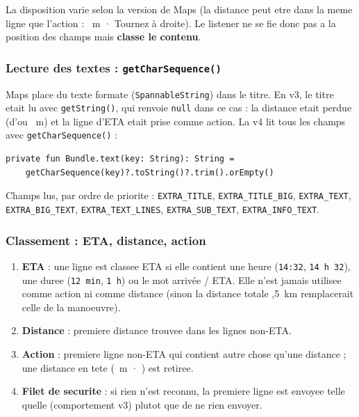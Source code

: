 \documentclass[a4paper,11pt]{article}
\begin{document}
La disposition varie selon la version de Maps (la distance peut etre dans la meme ligne
que l'action : ~m · Tournez à droite\fg{}). Le listener ne se fie donc pas a la
position des champs mais \textbf{classe le contenu}.

\subsubsection{Lecture des textes : \texttt{getCharSequence()}}

Maps place du texte formate (\texttt{SpannableString}) dans le titre. En v3, le titre etait
lu avec \texttt{getString()}, qui renvoie \texttt{null} dans ce cas : la distance etait
perdue (d'ou ~m\fg{}) et la ligne d'ETA etait prise comme action. La v4 lit tous les
champs avec \texttt{getCharSequence()} :

\begin{lstlisting}[style=ktcode]
private fun Bundle.text(key: String): String =
    getCharSequence(key)?.toString()?.trim().orEmpty()
\end{lstlisting}

Champs lus, par ordre de priorite : \texttt{EXTRA\_TITLE}, \texttt{EXTRA\_TITLE\_BIG},
\texttt{EXTRA\_TEXT}, \texttt{EXTRA\_BIG\_TEXT}, \texttt{EXTRA\_TEXT\_LINES},
\texttt{EXTRA\_SUB\_TEXT}, \texttt{EXTRA\_INFO\_TEXT}.

\subsubsection{Classement : ETA, distance, action}

\begin{enumerate}
  \item \textbf{ETA} : une ligne est classee ETA si elle contient une heure
    (\texttt{14:32}, \texttt{14 h 32}), une duree (\texttt{12 min}, \texttt{1 h}) ou le mot
    \og arrivée\fg{} / \og ETA\fg{}. Elle n'est jamais utilisee comme action ni comme
    distance (sinon la distance totale ,5~km\fg{} remplacerait celle de la manoeuvre).
  \item \textbf{Distance} : premiere distance trouvee dans les lignes non-ETA.
  \item \textbf{Action} : premiere ligne non-ETA qui contient autre chose qu'une distance ;
    une distance en tete (~m · \fg{}) est retiree.
  \item \textbf{Filet de securite} : si rien n'est reconnu, la premiere ligne est envoyee
    telle quelle (comportement v3) plutot que de ne rien envoyer.
\end{enumerate}
\end{document}
